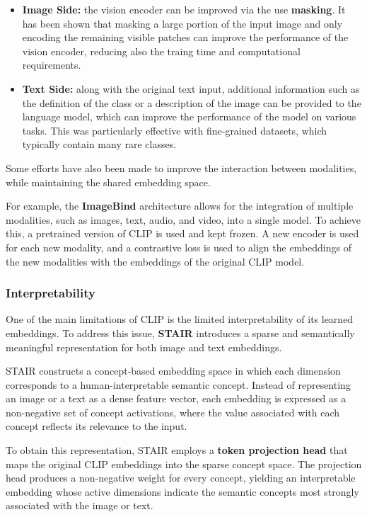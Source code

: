 \begin{itemize}
    \item \textbf{Image Side:} the vision encoder can be improved via the use \textbf{masking}. 
    It has been shown that masking a large portion of the input image and only encoding the remaining visible patches
    can improve the performance of the vision encoder, reducing also the traing time and computational requirements.

    \item \textbf{Text Side:} along with the original text input, additional information such as the definition of the class or a description of the image can be provided to the language model, 
    which can improve the performance of the model on various tasks. This was particularly effective with fine-grained datasets, which typically contain many rare classes.
\end{itemize}

Some efforts have also been made to improve the interaction between modalities, while maintaining the shared embedding space.

For example, the \textbf{ImageBind} architecture allows for the integration of multiple modalities, such as images, text, audio, and video, into a single model.
To achieve this, a pretrained version of CLIP is used and kept frozen. A new encoder is used for each new modality, 
and a contrastive loss is used to align the embeddings of the new modalities with the embeddings of the original CLIP model.

\subsubsection{Interpretability}
One of the main limitations of CLIP is the limited interpretability of its learned embeddings. 
To address this issue, \textbf{STAIR} introduces a sparse and semantically meaningful representation for both image and text embeddings.

STAIR constructs a concept-based embedding space in which each dimension corresponds to a human-interpretable semantic concept. 
Instead of representing an image or a text as a dense feature vector, each embedding is expressed as a non-negative set of concept activations, 
where the value associated with each concept reflects its relevance to the input.

To obtain this representation, STAIR employs a \textbf{token projection head} that maps the original CLIP embeddings into the sparse concept space. The projection head produces a non-negative weight for every concept, yielding an interpretable embedding whose active dimensions indicate the semantic concepts most strongly associated with the image or text.


